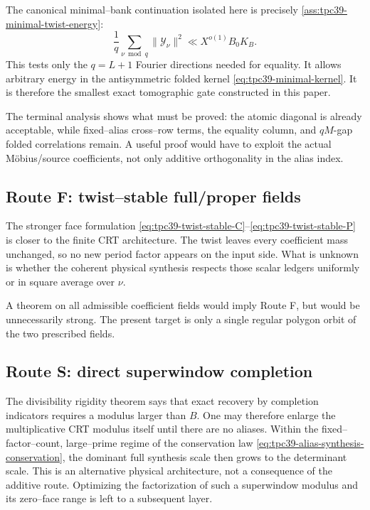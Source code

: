 The canonical minimal--bank continuation isolated here is precisely
\cref{ass:tpc39-minimal-twist-energy}:
\begin{equation}
 \frac1q\sum_{\nu\bmod q}\|\mathscr Y_\nu\|^2
 \ll X^{o(1)}B_0K_B.
 \label{eq:tpc39-next-route-T}
\end{equation}
This tests only the \(q=L+1\) Fourier directions needed for equality.
It allows arbitrary energy in the antisymmetric folded kernel
\eqref{eq:tpc39-minimal-kernel}.  It is therefore the smallest exact
tomographic gate constructed in this paper.

The terminal analysis shows what must be proved: the atomic diagonal is
already acceptable, while fixed--alias cross--row terms, the equality
column, and \(qM\)-gap folded correlations remain.  A useful proof would
have to exploit the actual M\"obius/source coefficients, not only additive
orthogonality in the alias index.

\subsection{Route F: twist--stable full/proper fields}

The stronger face formulation
\eqref{eq:tpc39-twist-stable-C}--\eqref{eq:tpc39-twist-stable-P} is closer
to the finite CRT architecture.  The twist leaves every coefficient mass
unchanged, so no new period factor appears on the input side.  What is
unknown is whether the coherent physical synthesis respects those scalar
ledgers uniformly or in square average over \(\nu\).

A theorem on all admissible coefficient fields would imply Route F, but
would be unnecessarily strong.  The present target is only a single
regular polygon orbit of the two prescribed fields.

\subsection{Route S: direct superwindow completion}

The divisibility rigidity theorem says that exact recovery by completion
indicators requires a modulus larger than \(B\).  One may therefore enlarge
the multiplicative CRT modulus itself until there are no aliases.  Within
the fixed--factor--count, large--prime regime of the conservation law
\eqref{eq:tpc39-alias-synthesis-conservation}, the dominant full synthesis
scale then grows to the determinant scale.  This is an
alternative physical architecture, not a consequence of the additive
route.  Optimizing the factorization of such a superwindow modulus and its
zero--face range is left to a subsequent layer.

